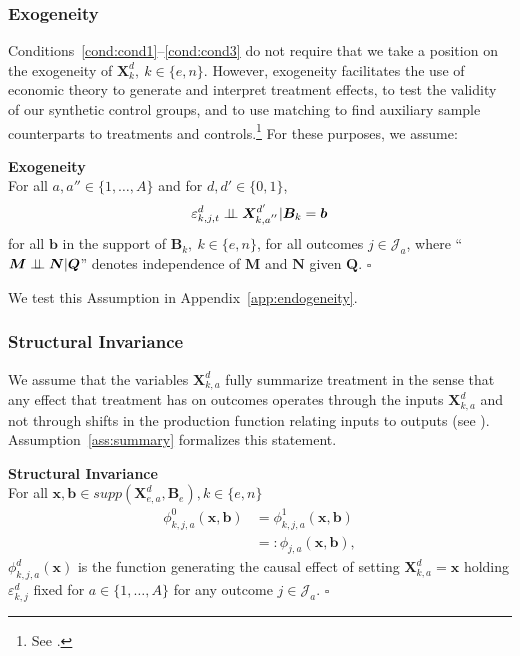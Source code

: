 \subsubsection{Exogeneity}

Conditions~\ref{cond:cond1}--\ref{cond:cond3} do not require that we take a position on the exogeneity of $\bm{X}^d_k, \: k \in \{e,n\}$. However, exogeneity facilitates the use of economic theory to generate and interpret treatment effects, to test the validity of our synthetic control groups, and to use matching to find auxiliary sample counterparts to treatments and controls.\footnote{See \cite{Heckman_Navarro_2004_REStat}.} For these purposes, we assume:

\onehalfspacing
\begin{assumption}\label{ass:exog} \textbf{Exogeneity}\\
For all $a, a'' \in \{ 1, \ldots, A \}$ and for $d, d' \in \{0,1\}$,
\begin{equation}
\varepsilon^d_{k,j,t} \perp\!\!\!\perp \bm{X}^{d^{\prime}}_{k,a^{''}} | \bm{B}_k = \bm{b}
\end{equation}
for all $\bm{b}$ in the support of $\bm{B}_k, \: k \in \{e,n\}$, for all outcomes $j \in \mathcal{J}_{a}$, where ``$\bm{M} \perp\!\!\!\perp \bm{N}|\bm{Q}$'' denotes independence of $\bm{M}$ and $\bm{N}$ given $\bm{Q}$. $\square$
\end{assumption}
\doublespacing

\noindent We test this Assumption in Appendix~\ref{app:endogeneity}.

\subsubsection{Structural Invariance}

We assume that the variables $\bm{X}_{k,a}^d$ fully summarize treatment in the sense that any effect that treatment has on outcomes operates through the inputs $\bm{X}_{k,a}^d$ and not through shifts in the production function relating inputs to outputs (see \citealp{Heckman_Pinto_etal_2013_PerryFactor}). Assumption~\ref{ass:summary} formalizes this statement.

\onehalfspacing
\begin{assumption} \label{ass:summary} \textbf{Structural Invariance}\\
For all $\bm{x}, \bm{b} \in supp(\bm{X}^d_{e,a}, \bm{B}_e), k \in \{e,n\}$
\begin{align}
\phi_{k,j,a}^0 \left( \bm{x}, \bm{b} \right) &= \phi_{k,j,a}^1 (\bm{x}, \bm{b}) \\   \nonumber
                                                                     &=: \phi_{j,a} (\bm{x}, \bm{b}),
\end{align}
$\phi^d_{k,j,a}(\bm{x})$ is the function generating the causal effect of setting $\bm{X}^d_{k,a}=\bm{x}$ holding $\varepsilon^d_{k,j}$ fixed for $a \in \{1,\dots,A\}$ for any outcome $j \in \mathcal{J}_{a}$. $\square$
\end{assumption}
\doublespacing

